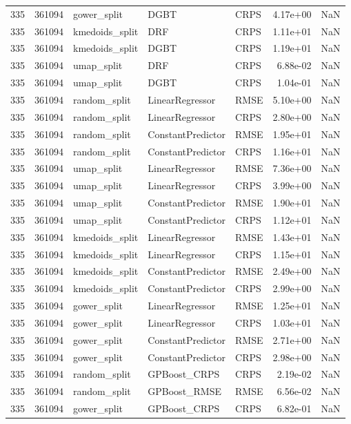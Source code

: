 \begin{tabular}{rrlllrr}
335 & 361094 & gower\_split & DGBT & CRPS & 4.17e+00 & NaN \\
335 & 361094 & kmedoids\_split & DRF & CRPS & 1.11e+01 & NaN \\
335 & 361094 & kmedoids\_split & DGBT & CRPS & 1.19e+01 & NaN \\
335 & 361094 & umap\_split & DRF & CRPS & 6.88e-02 & NaN \\
335 & 361094 & umap\_split & DGBT & CRPS & 1.04e-01 & NaN \\
335 & 361094 & random\_split & LinearRegressor & RMSE & 5.10e+00 & NaN \\
335 & 361094 & random\_split & LinearRegressor & CRPS & 2.80e+00 & NaN \\
335 & 361094 & random\_split & ConstantPredictor & RMSE & 1.95e+01 & NaN \\
335 & 361094 & random\_split & ConstantPredictor & CRPS & 1.16e+01 & NaN \\
335 & 361094 & umap\_split & LinearRegressor & RMSE & 7.36e+00 & NaN \\
335 & 361094 & umap\_split & LinearRegressor & CRPS & 3.99e+00 & NaN \\
335 & 361094 & umap\_split & ConstantPredictor & RMSE & 1.90e+01 & NaN \\
335 & 361094 & umap\_split & ConstantPredictor & CRPS & 1.12e+01 & NaN \\
335 & 361094 & kmedoids\_split & LinearRegressor & RMSE & 1.43e+01 & NaN \\
335 & 361094 & kmedoids\_split & LinearRegressor & CRPS & 1.15e+01 & NaN \\
335 & 361094 & kmedoids\_split & ConstantPredictor & RMSE & 2.49e+00 & NaN \\
335 & 361094 & kmedoids\_split & ConstantPredictor & CRPS & 2.99e+00 & NaN \\
335 & 361094 & gower\_split & LinearRegressor & RMSE & 1.25e+01 & NaN \\
335 & 361094 & gower\_split & LinearRegressor & CRPS & 1.03e+01 & NaN \\
335 & 361094 & gower\_split & ConstantPredictor & RMSE & 2.71e+00 & NaN \\
335 & 361094 & gower\_split & ConstantPredictor & CRPS & 2.98e+00 & NaN \\
335 & 361094 & random\_split & GPBoost\_CRPS & CRPS & 2.19e-02 & NaN \\
335 & 361094 & random\_split & GPBoost\_RMSE & RMSE & 6.56e-02 & NaN \\
335 & 361094 & gower\_split & GPBoost\_CRPS & CRPS & 6.82e-01 & NaN \\

\end{tabular}

